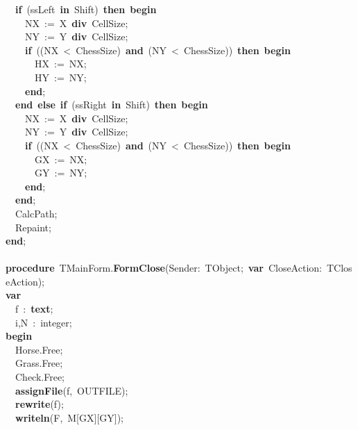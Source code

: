 \mbox{}\ \ \textbf{if}\ (ssLeft\ \textbf{in}\ Shift)\ \textbf{then}\ \textbf{begin} \\
\mbox{}\ \ \ \ NX\ :=\ X\ \textbf{div}\ CellSize; \\
\mbox{}\ \ \ \ NY\ :=\ Y\ \textbf{div}\ CellSize; \\
\mbox{}\ \ \ \ \textbf{if}\ ((NX\ \textless{}\ ChessSize)\ \textbf{and}\ (NY\ \textless{}\ ChessSize))\ \textbf{then}\ \textbf{begin} \\
\mbox{}\ \ \ \ \ \ HX\ :=\ NX; \\
\mbox{}\ \ \ \ \ \ HY\ :=\ NY; \\
\mbox{}\ \ \ \ \textbf{end}; \\
\mbox{}\ \ \textbf{end}\ \textbf{else}\ \textbf{if}\ (ssRight\ \textbf{in}\ Shift)\ \textbf{then}\ \textbf{begin} \\
\mbox{}\ \ \ \ NX\ :=\ X\ \textbf{div}\ CellSize; \\
\mbox{}\ \ \ \ NY\ :=\ Y\ \textbf{div}\ CellSize; \\
\mbox{}\ \ \ \ \textbf{if}\ ((NX\ \textless{}\ ChessSize)\ \textbf{and}\ (NY\ \textless{}\ ChessSize))\ \textbf{then}\ \textbf{begin} \\
\mbox{}\ \ \ \ \ \ GX\ :=\ NX; \\
\mbox{}\ \ \ \ \ \ GY\ :=\ NY; \\
\mbox{}\ \ \ \ \textbf{end}; \\
\mbox{}\ \ \textbf{end}; \\
\mbox{}\ \ CalcPath; \\
\mbox{}\ \ Repaint; \\
\mbox{}\textbf{end}; \\
\mbox{} \\
\mbox{}\textbf{procedure}\ TMainForm.\textbf{FormClose}(Sender:\ TObject;\ \textbf{var}\ CloseAction:\ TCloseAction); \\
\mbox{}\textbf{var} \\
\mbox{}\ \ f\ :\ \textbf{text}; \\
\mbox{}\ \ i,N\ :\ integer; \\
\mbox{}\textbf{begin} \\
\mbox{}\ \ Horse.Free; \\
\mbox{}\ \ Grass.Free; \\
\mbox{}\ \ Check.Free; \\
\mbox{}\ \ \textbf{assignFile}(f,\ OUTFILE); \\
\mbox{}\ \ \textbf{rewrite}(f); \\
\mbox{}\ \ \textbf{writeln}(F,\ M[GX][GY]); \\
